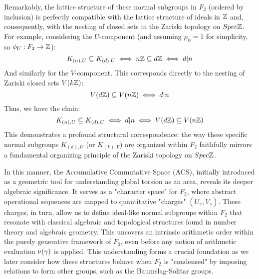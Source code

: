 Remarkably, the lattice structure of these normal subgroups in $F_2$ (ordered by inclusion) is perfectly compatible with the lattice structure of ideals in $\mathbb{Z}$ and, consequently, with the nesting of closed sets in the Zariski topology on $Spec \mathbb{Z}$. For example, considering the $U$-component (and assuming $\mu_0=1$ for simplicity, so $\phi_U: F_2 \to \mathbb{Z}$):
\[ K_{(n),U} \subseteq K_{(d),U} \iff n\mathbb{Z} \subseteq d\mathbb{Z} \iff d|n \]
And similarly for the $V$-component. This corresponds directly to the nesting of Zariski closed sets $V(k\mathbb{Z})$:
\[ V(d\mathbb{Z}) \subseteq V(n\mathbb{Z}) \iff d|n \]
Thus, we have the chain:
\[ K_{(n),U} \subseteq K_{(d),U} \iff d|n \iff V(d\mathbb{Z}) \subseteq V(n\mathbb{Z}) \]
This demonstrates a profound structural correspondence: the way these specific normal subgroups $K_{(k),U}$ (or $K_{(k),V}$) are organized within $F_2$ faithfully mirrors a fundamental organizing principle of the Zariski topology on $Spec \mathbb{Z}$.

In this manner, the Accumulative Commutative Space (ACS), initially introduced as a geometric tool for understanding global torsion as an area, reveals its deeper algebraic significance. It serves as a "character space" for $F_2$, where abstract operational sequences are mapped to quantitative "charges" $(U_\gamma, V_\gamma)$. These charges, in turn, allow us to define ideal-like normal subgroups within $F_2$ that resonate with classical algebraic and topological structures found in number theory and algebraic geometry. This uncovers an intrinsic arithmetic order within the purely generative framework of $F_2$, even before any notion of arithmetic evaluation $\nu(\gamma)$ is applied. This understanding forms a crucial foundation as we later consider how these structures behave when $F_2$ is "condensed" by imposing relations to form other groups, such as the Baumslag-Solitar groups.
